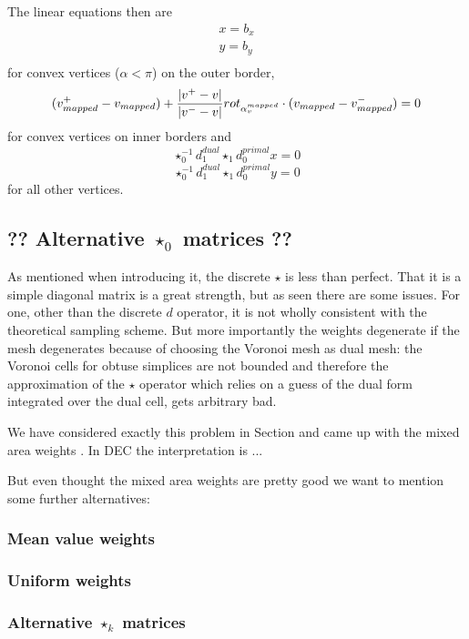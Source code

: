 The linear equations then are
\begin{eqnarray*}
 &x = b_x & \\
 &y = b_y &\\
\end{eqnarray*}
for convex vertices ($\alpha < \pi$) on the outer border,
\[(v^+_{mapped}-v_{mapped} ) + \frac{\left| v^+-v \right|}{\left| v^- -v \right|}rot_{\alpha_v^{mapped}} \cdot (v_{mapped} - v_{mapped}^- )= 0 \]
for convex vertices on inner borders and
\[\star_0^{-1} d_1^{dual} \star_1 d_0^{primal} x = 0\]
\[\star_0^{-1} d_1^{dual} \star_1 d_0^{primal} y = 0\]
for all other vertices.


\subsection{?? Alternative $\star_0$ matrices ??}
As mentioned when introducing it, the discrete $\star$ is less than perfect. That it is a simple diagonal matrix is a great strength, but as seen there are some issues. For one, other than the discrete $d$ operator, it is not wholly consistent with the theoretical sampling scheme. But more importantly the weights degenerate if the mesh degenerates because of choosing the Voronoi mesh as dual mesh: the Voronoi cells for obtuse simplices are not bounded and therefore the approximation of the $\star$ operator which relies on a guess of the dual form integrated over the dual cell, gets arbitrary bad.

We have considered exactly this problem in Section  and came up with the mixed area weights . In DEC the interpretation is ...

But even thought the mixed area weights are pretty good we want to mention some further alternatives:

\subsubsection{Mean value weights}

\subsubsection{Uniform weights}

\subsubsection{Alternative $\star_k$ matrices}

